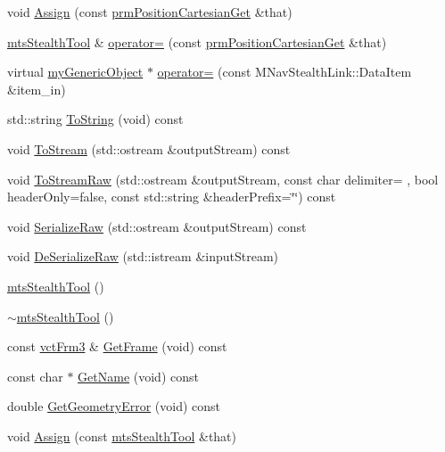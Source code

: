 \begin{DoxyCompactItemize}
void \hyperlink{classmts_stealth_tool_a371596656a661001c3691ae510dab17b}{Assign} (const \hyperlink{classprm_position_cartesian_get}{prm\+Position\+Cartesian\+Get} \&that)
\item 
\hyperlink{classmts_stealth_tool}{mts\+Stealth\+Tool} \& \hyperlink{classmts_stealth_tool_afd3d34f5974e9e9d182c0cf7b58b1c5e}{operator=} (const \hyperlink{classprm_position_cartesian_get}{prm\+Position\+Cartesian\+Get} \&that)
\item 
virtual \hyperlink{classmy_generic_object}{my\+Generic\+Object} $\ast$ \hyperlink{classmts_stealth_tool_a0e77e6a830e75276f11435b65f8fb376}{operator=} (const M\+Nav\+Stealth\+Link\+::\+Data\+Item \&item\+\_\+in)
\item 
std\+::string \hyperlink{classmts_stealth_tool_a18a31c80172f4f6280673c1db6ca8c5b}{To\+String} (void) const 
\item 
void \hyperlink{classmts_stealth_tool_a7550641c7e9eb89a5d1a77f4d48c47e9}{To\+Stream} (std\+::ostream \&output\+Stream) const 
\item 
void \hyperlink{classmts_stealth_tool_a6bfabcb3bee465c02dc9c42578dfd220}{To\+Stream\+Raw} (std\+::ostream \&output\+Stream, const char delimiter= \textquotesingle{} \textquotesingle{}, bool header\+Only=false, const std\+::string \&header\+Prefix=\char`\"{}\char`\"{}) const 
\item 
void \hyperlink{classmts_stealth_tool_a1fa41dcc1d7260a3ddd7f2d5ea7732c9}{Serialize\+Raw} (std\+::ostream \&output\+Stream) const 
\item 
void \hyperlink{classmts_stealth_tool_ad346445c8f547aac0f99e869a585d90a}{De\+Serialize\+Raw} (std\+::istream \&input\+Stream)
\item 
\hyperlink{classmts_stealth_tool_aa883de2b768f98fec69a6bc857b78323}{mts\+Stealth\+Tool} ()
\item 
\hyperlink{classmts_stealth_tool_a86b22b54518d7c3535e85e17f71d9cad}{$\sim$mts\+Stealth\+Tool} ()
\item 
const \hyperlink{vct_transformation_types_8h_a81feda0a02c2d1bc26e5553f409fed20}{vct\+Frm3} \& \hyperlink{classmts_stealth_tool_a45f638dd4baf99c685c050a87323fd82}{Get\+Frame} (void) const 
\item 
const char $\ast$ \hyperlink{classmts_stealth_tool_a99340f0661adaa23eabaf43394360164}{Get\+Name} (void) const 
\item 
double \hyperlink{classmts_stealth_tool_a83bb8e4413f625850653416e374b6fee}{Get\+Geometry\+Error} (void) const 
\item 
void \hyperlink{classmts_stealth_tool_a16fe29f2e0b33e1f2249a32c3adcae4a}{Assign} (const \hyperlink{classmts_stealth_tool}{mts\+Stealth\+Tool} \&that)

\end{DoxyCompactItemize}
